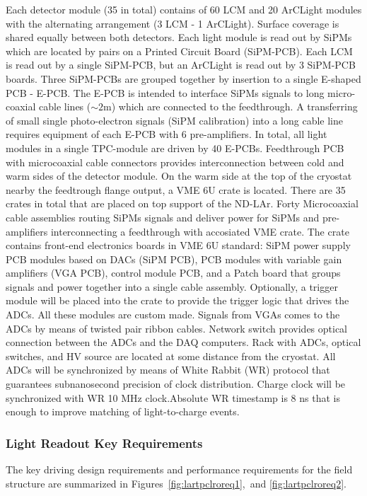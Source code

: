 Each detector module (\num{35} in total) contains of \num{60} LCM and \num{20} ArCLight modules with the alternating arrangement (\num{3} LCM - \num{1} ArCLight). Surface coverage is shared equally between both detectors. Each light module is read out by SiPMs which are located by pairs on a Printed Circuit Board (SiPM-PCB). Each LCM is read out by a single SiPM-PCB, but an ArCLight is read out by \num{3} SiPM-PCB boards. Three SiPM-PCBs are grouped together by insertion to a single E-shaped PCB - E-PCB. The E-PCB is intended to interface SiPMs signals to long micro-coaxial cable lines ($\sim2$m) which are connected to the feedthrough. A transferring of small single photo-electron signals (SiPM calibration) into a long cable line requires equipment of each E-PCB with \num{6} pre-amplifiers. In total, all light modules in a single TPC-module are driven by  \num{40} E-PCBs. Feedthrough PCB with microcoaxial cable connectors provides interconnection between cold and warm sides of the detector module. On the warm side at the top of the cryostat nearby the feedtrough flange output, a VME 6U crate is located. There are 35 crates in total that are placed on top support of the ND-LAr. Forty Microcoaxial cable assemblies routing SiPMs signals and deliver power for SiPMs and pre-amplifiers interconnecting a feedthrough with accosiated  VME crate. The crate contains front-end electronics boards in VME 6U standard: SiPM power supply PCB modules based on DACs (SiPM PCB), PCB modules with variable gain amplifiers (VGA PCB), control module PCB, and a Patch board that  groups signals and power together into a single cable assembly. Optionally, a trigger module will be placed into the crate to provide the trigger logic that drives the ADCs. All these modules are custom made. Signals from VGAs comes to the ADCs by means of twisted pair ribbon cables. Network switch provides optical connection between the ADCs and the DAQ computers. Rack with ADCs, optical switches, and HV source are located at some distance from the cryostat.  
All ADCs will be synchronized by means of White Rabbit (WR) protocol that guarantees subnanosecond precision of clock distribution. Charge clock will be synchronized with WR 10 MHz clock.Absolute WR timestamp is 8 ns that is enough to improve matching of light-to-charge events.
\subsubsection{Light Readout Key Requirements}
\label{sec:lartpc-lro-req}
The key driving design requirements and performance requirements for the field structure are summarized in Figures~\ref{fig:lartpclroreq1},~and \ref{fig:lartpclroreq2}. 

